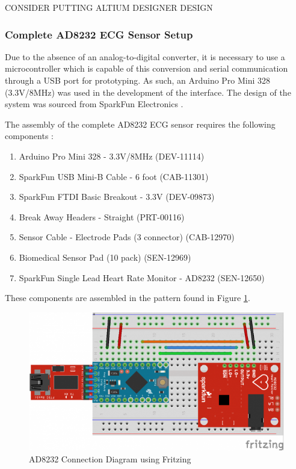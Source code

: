CONSIDER PUTTING ALTIUM DESIGNER DESIGN

\subsubsection*{Complete AD8232 ECG Sensor Setup}

Due to the absence of an analog-to-digital converter, it is necessary to use a microcontroller which is capable of this conversion and serial communication through a USB port for prototyping. As such, an Arduino Pro Mini 328 (3.3V/8MHz) was used in the development of the interface. The design of the system was sourced from SparkFun Electronics \cite{ad8232}. 

The assembly of the complete AD8232 ECG sensor requires the following components \cite{ad8232}:

\begin{enumerate}
	\item Arduino Pro Mini 328 - 3.3V/8MHz (DEV-11114)
	\item SparkFun USB Mini-B Cable - 6 foot (CAB-11301)
	\item SparkFun FTDI Basic Breakout - 3.3V (DEV-09873)
	\item Break Away Headers - Straight (PRT-00116)
	\item Sensor Cable - Electrode Pads (3 connector) (CAB-12970)
	\item Biomedical Sensor Pad (10 pack) (SEN-12969) 
	\item SparkFun Single Lead Heart Rate Monitor - AD8232 (SEN-12650) 
\end{enumerate}

These components are assembled in the pattern found in Figure \ref{ad8232sffritzing}. 

\begin{figure}[H]
	\centering
	\includegraphics[width=0.9\linewidth]{ad8232fritzing.png}
	\caption{AD8232 Connection Diagram using Fritzing \cite{ad8232}}
	\label{ad8232sffritzing}
\end{figure}

